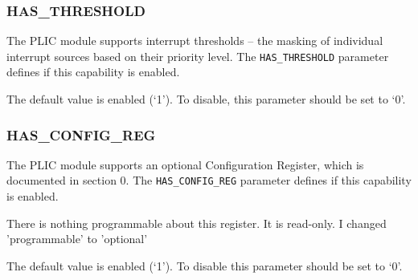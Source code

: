 \subsubsection{HAS\_THRESHOLD}

The PLIC module supports interrupt thresholds -- the masking of
individual interrupt sources based on their priority level. The
\texttt{HAS\_THRESHOLD} parameter defines if this capability is enabled.

The default value is enabled (`1'). To disable, this parameter should be
set to `0'.

\subsubsection{HAS\_CONFIG\_REG}

The PLIC module supports an optional Configuration Register, which is
documented in section 0. The \texttt{HAS\_CONFIG\_REG} parameter defines
if this capability is enabled.

\comment
There is nothing programmable about this register. It is read-only.
I changed 'programmable' to 'optional'
\endcomment

The default value is enabled (`1'). To disable this parameter should be
set to `0'.
